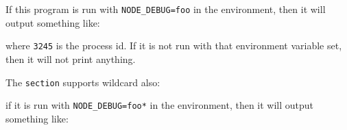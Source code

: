 \begin{Shaded}
\begin{Highlighting}[]
\OperatorTok{=} \NormalTok{(}\NormalTok{)}\OperatorTok{;}
\OperatorTok{=}\NormalTok{(}\NormalTok{)}\OperatorTok{;}

\NormalTok{(}\OperatorTok{,} \NormalTok{)}\OperatorTok{;}
\end{Highlighting}
\end{Shaded}

If this program is run with \texttt{NODE\_DEBUG=foo} in the environment,
then it will output something like:

\begin{Shaded}
\begin{Highlighting}[]
\end{Highlighting}
\end{Shaded}

where \texttt{3245} is the process id. If it is not run with that
environment variable set, then it will not print anything.

The \texttt{section} supports wildcard also:

\begin{Shaded}
\begin{Highlighting}[]
\OperatorTok{=} \NormalTok{(}\NormalTok{)}\OperatorTok{;}
\OperatorTok{=}\NormalTok{(}\NormalTok{)}\OperatorTok{;}

\NormalTok{(}\SpecialCharTok{\textbackslash{}\textquotesingle{}}\OperatorTok{,} \NormalTok{)}\OperatorTok{;}
\end{Highlighting}
\end{Shaded}

if it is run with \texttt{NODE\_DEBUG=foo*} in the environment, then it
will output something like:

